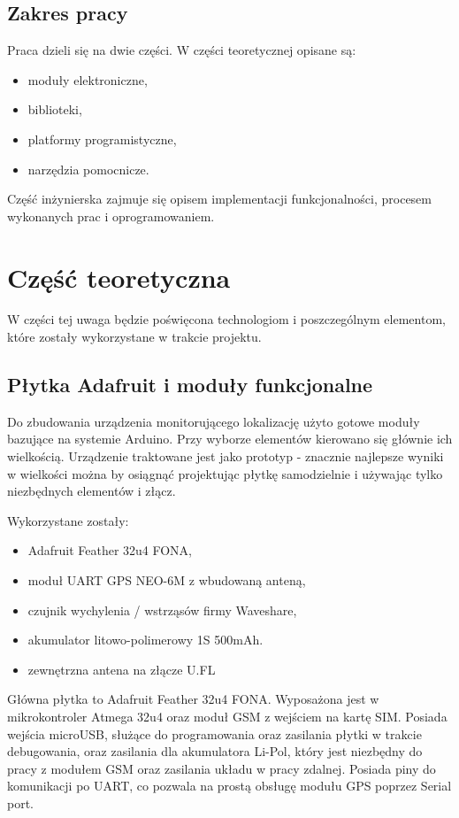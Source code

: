 \documentclass[eng,printmode]{mgr}
\begin{document}
\section{Zakres pracy}
Praca dzieli się na dwie części. W części teoretycznej opisane są:
\begin{itemize}
\item moduły elektroniczne,
\item biblioteki,
\item platformy programistyczne,
\item narzędzia pomocnicze.
\end{itemize}
Część inżynierska zajmuje się opisem implementacji funkcjonalności, procesem wykonanych prac i oprogramowaniem.

\chapter{Część teoretyczna}
W części tej uwaga będzie poświęcona technologiom i poszczególnym elementom, które zostały wykorzystane w trakcie projektu. 

\section{Płytka Adafruit i moduły funkcjonalne}
Do zbudowania urządzenia monitorującego lokalizację użyto gotowe moduły bazujące na systemie Arduino. Przy wyborze elementów kierowano się głównie ich wielkością. Urządzenie traktowane jest jako prototyp - znacznie najlepsze wyniki w wielkości można by osiągnąć projektując płytkę samodzielnie i używając tylko niezbędnych elementów i złącz.

Wykorzystane zostały:
\begin{itemize}
\item Adafruit Feather 32u4 FONA,
\item moduł UART GPS NEO-6M z wbudowaną anteną,
\item czujnik wychylenia / wstrząsów firmy Waveshare,
\item akumulator litowo-polimerowy 1S 500mAh.
\item zewnętrzna antena na złącze U.FL
\end{itemize}

Główna płytka to Adafruit Feather 32u4 FONA. Wyposażona jest w mikrokontroler Atmega 32u4 oraz moduł GSM z wejściem na kartę SIM. Posiada wejścia microUSB, służące do programowania oraz zasilania płytki w trakcie debugowania, oraz zasilania dla akumulatora Li-Pol, który jest niezbędny do pracy z modułem GSM oraz zasilania układu w pracy zdalnej. Posiada piny do komunikacji po UART, co pozwala na prostą obsługę modułu GPS poprzez Serial port.
\end{document}
